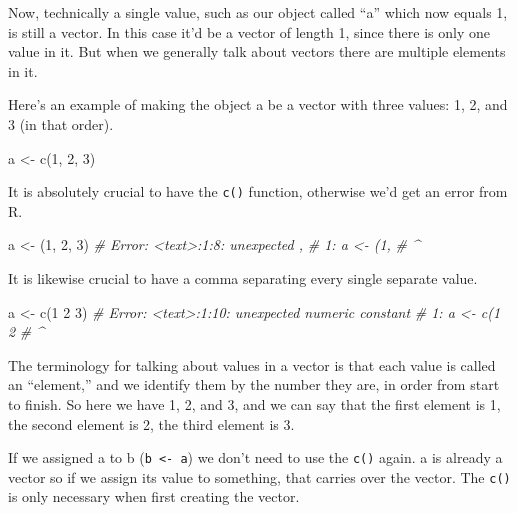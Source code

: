 \documentclass[
]{krantz}
\makeatletter
\newenvironment{Shaded}{\begin{snugshade}}{\end{snugshade}}
\newcommand{\CommentTok}[1]{\textcolor[rgb]{0.37,0.37,0.37}{\textit{#1}}}
\newcommand{\DecValTok}[1]{\textcolor[rgb]{0.06,0.06,0.06}{#1}}
\newcommand{\FunctionTok}[1]{\textcolor[rgb]{0,0,0}{#1}}
\newcommand{\NormalTok}[1]{#1}
\newcommand{\OtherTok}[1]{\textcolor[rgb]{0.37,0.37,0.37}{#1}}
\newenvironment{kframe}{%
\medskip{}
\setlength{\fboxsep}{.8em}
 \def\at@end@of@kframe{}%
 \ifinner\ifhmode%
  \def\at@end@of@kframe{\end{minipage}}%
  \begin{minipage}{\columnwidth}%
 \fi\fi%
 \def\FrameCommand##1{\hskip\@totalleftmargin \hskip-\fboxsep
 \colorbox{shadecolor}{##1}\hskip-\fboxsep
     \hskip-\linewidth \hskip-\@totalleftmargin \hskip\columnwidth}%
 \MakeFramed {\advance\hsize-\width
   \@totalleftmargin\z@ \linewidth\hsize
   \@setminipage}}%
 {\par\unskip\endMakeFramed%
 \at@end@of@kframe}
\renewenvironment{Shaded}{\begin{kframe}}{\end{kframe}}
\makeatother
\begin{document}
Now, technically a single value, such as our object called
``a'' which now equals 1, is still a vector. In this case
it'd be a vector of length 1, since there is only one value
in it. But when we generally talk about vectors there are
multiple elements in it.

Here's an example of making the object a be a vector with
three values: 1, 2, and 3 (in that order).

\begin{Shaded}
\begin{Highlighting}[]
\NormalTok{a }\OtherTok{\textless{}{-}} \FunctionTok{c}\NormalTok{(}\DecValTok{1}\NormalTok{, }\DecValTok{2}\NormalTok{, }\DecValTok{3}\NormalTok{)}
\end{Highlighting}
\end{Shaded}

It is absolutely crucial to have the \texttt{c()} function,
otherwise we'd get an error from R.

\begin{Shaded}
\begin{Highlighting}[]
\NormalTok{a }\OtherTok{\textless{}{-}}\NormalTok{ (}\DecValTok{1}\NormalTok{, }\DecValTok{2}\NormalTok{, }\DecValTok{3}\NormalTok{)}
\CommentTok{\# Error: \textless{}text\textgreater{}:1:8: unexpected \textquotesingle{},\textquotesingle{}}
\CommentTok{\# 1: a \textless{}{-} (1,}
\CommentTok{\#            \^{}}
\end{Highlighting}
\end{Shaded}

It is likewise crucial to have a comma separating every
single separate value.

\begin{Shaded}
\begin{Highlighting}[]
\NormalTok{a }\OtherTok{\textless{}{-}} \FunctionTok{c}\NormalTok{(}\DecValTok{1} \DecValTok{2} \DecValTok{3}\NormalTok{)}
\CommentTok{\# Error: \textless{}text\textgreater{}:1:10: unexpected numeric constant}
\CommentTok{\# 1: a \textless{}{-} c(1 2}
\CommentTok{\#              \^{}}
\end{Highlighting}
\end{Shaded}

The terminology for talking about values in a vector is that
each value is called an ``element,'' and we identify them by
the number they are, in order from start to finish. So here
we have 1, 2, and 3, and we can say that the first element
is 1, the second element is 2, the third element is 3.

If we assigned a to b (\texttt{b\ \textless{}-\ a}) we don't
need to use the \texttt{c()} again. a is already a vector so
if we assign its value to something, that carries over the
vector. The \texttt{c()} is only necessary when first
creating the vector.
\end{document}
